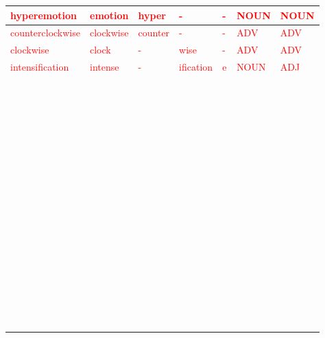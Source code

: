 \documentclass[11pt]{article}
\begin{document}
\begin{enumerate}
\begin{center}
\begin{tabular}{|l|l||l|l|l|l||l|}
   \textcolor{red}{hyperemotion} & \textcolor{red}{emotion} & \textcolor{red}{hyper}& \textcolor{red}{-} & \textcolor{red}{-} & \textcolor{red}{NOUN} & \textcolor{red}{NOUN} \\ \hline \hline
   \textcolor{red}{counterclockwise} & \textcolor{red}{clockwise} & \textcolor{red}{counter} & \textcolor{red}{-}  & \textcolor{red}{-}  &\textcolor{red}{ADV} & \textcolor{red}{ADV}  \\
   \textcolor{red}{clockwise} & \textcolor{red}{clock} & \textcolor{red}{-} & \textcolor{red}{wise}  & \textcolor{red}{-}  &\textcolor{red}{ADV} & \textcolor{red}{ADV}  \\ \hline \hline
   \textcolor{red}{intensification}& \textcolor{red}{intense}& \textcolor{red}{-} & \textcolor{red}{ification}  & \textcolor{red}{e}& \textcolor{red}{NOUN} & \textcolor{red}{ADJ}\\  \hline \hline

   ~ & ~ & ~ & ~ & ~ & ~ & ~ \\
 ~ & ~ & ~ & ~ & ~ & ~ & ~ \\
 ~ & ~ & ~ & ~ & ~ & ~ & ~ \\
 ~ & ~ & ~ & ~ & ~ & ~ & ~ \\
 ~ & ~ & ~ & ~ & ~ & ~ & ~ \\
 ~ & ~ & ~ & ~ & ~ & ~ & ~ \\
 ~ & ~ & ~ & ~ & ~ & ~ & ~ \\
 ~ & ~ & ~ & ~ & ~ & ~ & ~ \\
 ~ & ~ & ~ & ~ & ~ & ~ & ~ \\
 ~ & ~ & ~ & ~ & ~ & ~ & ~ \\
 ~ & ~ & ~ & ~ & ~ & ~ & ~ \\
 ~ & ~ & ~ & ~ & ~ & ~ & ~ \\
 ~ & ~ & ~ & ~ & ~ & ~ & ~ \\
 ~ & ~ & ~ & ~ & ~ & ~ & ~ \\
 ~ & ~ & ~ & ~ & ~ & ~ & ~ \\ \hline
  \end{tabular}
  \end{center}


\end{enumerate}
\end{document}
